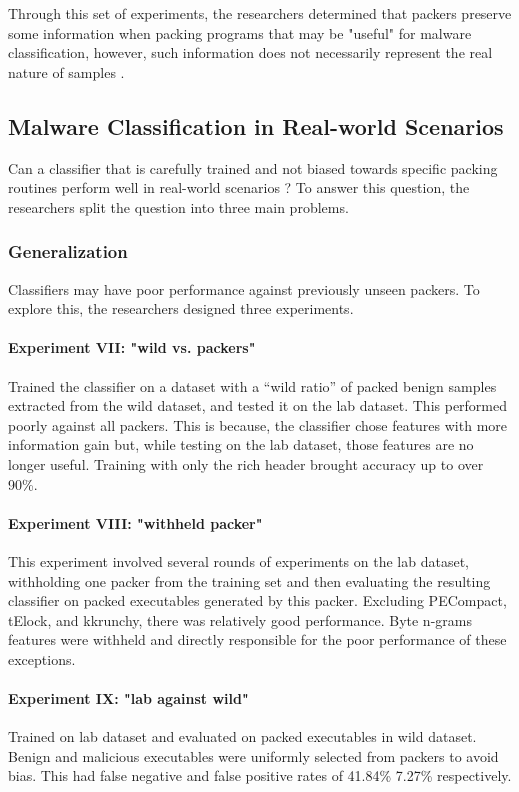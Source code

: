 \documentclass[sigconf]{acmart}
\begin{document}
Through this set of experiments, the researchers determined that packers preserve some information when packing programs that may be "useful" for malware classification, however, such information does not necessarily represent the real nature of samples \cite{Aghakhani2020}.
\subsection{Malware Classification in Real-world Scenarios}
Can a classifier that is carefully trained and not biased towards specific packing routines perform well in real-world scenarios \cite{Aghakhani2020}? To answer this question, the researchers split the question into three main problems.
\subsubsection{Generalization}
Classifiers may have poor performance against previously unseen packers. To explore this, the researchers designed three experiments.
\paragraph{Experiment VII: "wild vs. packers"}
Trained the classifier on a dataset with a “wild ratio” of packed benign samples extracted from the wild dataset, and tested it on the lab dataset.
This performed poorly against all packers. This is because, the classifier chose features with more information gain but, while testing on the lab dataset, those features are no longer useful.
Training with only the rich header brought accuracy up to over 90\%.
\paragraph{Experiment VIII: "withheld packer"}
This experiment involved several rounds of experiments on the lab dataset, withholding one packer from the training set and then evaluating the resulting classifier on packed executables generated by this packer.
Excluding PECompact, tElock, and kkrunchy, there was relatively good performance. Byte n-grams features were withheld and directly responsible for the poor performance of these exceptions.
\paragraph{Experiment IX: "lab against wild"}
Trained on lab dataset and evaluated on packed executables in wild dataset.
Benign and malicious executables were uniformly selected from packers to avoid bias.
This had false negative and false positive rates of 41.84\%  7.27\% respectively.
\end{document}
